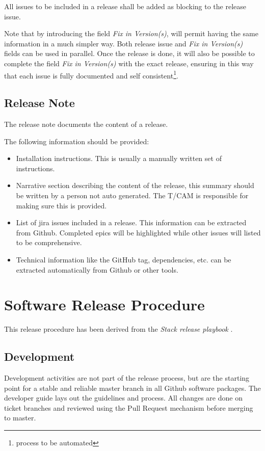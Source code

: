 All issues to be included in a release shall be added as blocking to the release issue.

Note that by introducing the field \textit{Fix in Version(s)}, will permit having the same information in a much simpler way.
Both release issue and \textit{Fix in Version(s)} fields can be used in parallel.
Once the release is done, it will also be possible to complete the field \textit{Fix in Version(s)} with the exact release,
ensuring in this way that each issue is fully documented and self consistent\footnote{process to be automated}.


\subsection{Release Note} \label{sec:relnote}

The release note documents the content of a release.

The following information should be  provided:
\begin{itemize}
\item Installation instructions. This is usually a manually written set of instructions.
\item Narrative section describing the content of the release, this summary should be written by a person not auto generated.
The T/CAM is responsible for making sure this is provided.
\item List of jira issues included in a release. This information can be extracted from Github. Completed epics will be highlighted while other issues will  listed to be comprehensive.
\item Technical information like the GitHub tag, dependencies,  etc. can be extracted automatically from Github or other tools.
\end{itemize}


\newpage
\section{Software Release Procedure} \label{sec:releaseprocedure}

This release procedure has been derived from the \textit{Stack release playbook} .

\subsection{Development} \label{sec:dev}

Development activities are not part of the release process, but are the starting point for a stable and reliable master branch in all Github software packages.
The  developer guide lays out the guidelines and process. All changes are done on ticket branches and reviewed using the Pull Request mechanism before merging to master.

